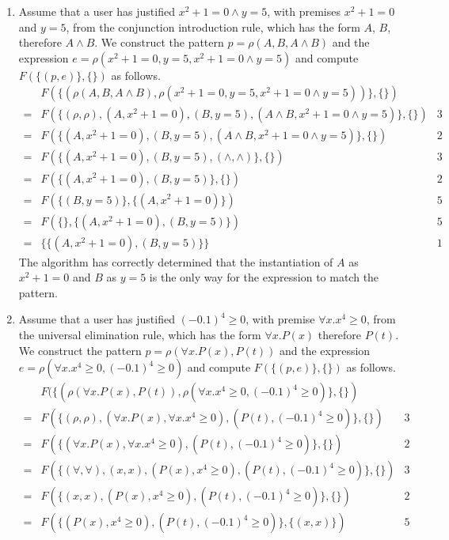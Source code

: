 \documentclass{article}
\begin{document}
\begin{enumerate}
\item	Assume that a user has justified $x^2+1=0\wedge y=5$, with premises $x^2+1=0$ and $y=5$, from the conjunction introduction rule, which has the form $A$, $B$, therefore $A\wedge B$.  We construct the pattern $p=\rho(A,B,A\wedge B)$ and the expression $e=\rho(x^2+1=0,y=5,x^2+1=0\wedge y=5)$ and compute $F(\{(p,e)\},\{\})$ as follows.
		\begin{align*}
			& F(\{(\rho(A,B,A\wedge B),\rho(x^2+1=0,y=5,x^2+1=0\wedge y=5))\},\{\}) \\
		={}	& F(\{(\rho,\rho),(A,x^2+1=0),(B,y=5),(A\wedge B,x^2+1=0\wedge y=5)\},\{\})
				&	3	\\
		={}	& F(\{(A,x^2+1=0),(B,y=5),(A\wedge B,x^2+1=0\wedge y=5)\},\{\}) & 2 \\
		={}	& F(\{(A,x^2+1=0),(B,y=5),(\wedge,\wedge)\},\{\}) & 3 \\
		={}	& F(\{(A,x^2+1=0),(B,y=5)\},\{\}) & 2 \\
		={}	& F(\{(B,y=5)\},\{(A,x^2+1=0)\}) & 5 \\
		={}	& F(\{\},\{(A,x^2+1=0),(B,y=5)\}) & 5 \\
		={}	& \Big\{\{(A,x^2+1=0),(B,y=5)\}\Big\} & 1
		\end{align*}
		The algorithm has correctly determined that the instantiation of $A$ as $x^2+1=0$ and $B$ as $y=5$ is the only way for the expression to match the pattern.
\item	Assume that a user has justified $(-0.1)^4\geq0$, with premise $\forall x.x^4\geq0$, from the universal elimination rule, which has the form $\forall x.P(x)$ therefore $P(t)$.  We construct the pattern $p=\rho(\forall x.P(x),P(t))$ and the expression $e=\rho(\forall x.x^4\geq0,(-0.1)^4\geq0)$ and compute $F(\{(p,e)\},\{\})$ as follows.
		\begin{align*}
			& F(\{(	\rho(\forall x.P(x),P(t)),
					\rho(\forall x.x^4\geq0,(-0.1)^4\geq0)\},\{\}) \\
		={}	& F(\{	(\rho,\rho), (\forall x.P(x),\forall x.x^4\geq0),
					(P(t),(-0.1)^4\geq0)\},\{\}) & 3 \\
		={}	& F(\{	(\forall x.P(x),\forall x.x^4\geq0),
					(P(t),(-0.1)^4\geq0)\},\{\}) & 2 \\
		={}	& F(\{	(\forall,\forall), (x,x), (P(x),x^4\geq0),
					(P(t),(-0.1)^4\geq0)\},\{\}) & 3 \\
		={}	& F(\{	(x,x), (P(x),x^4\geq0),	(P(t),(-0.1)^4\geq0)\},\{\}) & 2 \\
		={}	& F(\{	(P(x),x^4\geq0), (P(t),(-0.1)^4\geq0)\},\{(x,x)\}) & 5 \\

\end{align*}
\end{enumerate}
\end{document}
